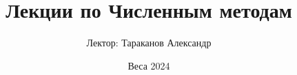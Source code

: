 \documentclass{article}
\begin{document}
\title{Лекции по Численным методам}
\author{Лектор: Тараканов Александр}
\date{Веса 2024}

\maketitle
\tableofcontents




\end{document}
